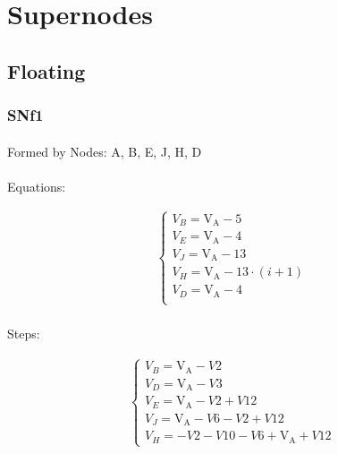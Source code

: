 \documentclass[a4paper]{article}
\begin{document}
\section{Supernodes}

\subsection{Floating}

\subsubsection{SNf1}


\paragraph{} Formed by Nodes: {A, B, E, J, H, D}
\par

\paragraph{} Equations:

\begin{gather*}
\begin{cases}
V_{B} = \mathrm{V_{A}}-5\\V_{E} = \mathrm{V_{A}}-4\\V_{J} = \mathrm{V_{A}}-13\\V_{H} = \mathrm{V_{A}}-13\cdot\left( i+1\right)\\V_{D} = \mathrm{V_{A}}-4\\
\end{cases}
\end{gather*}
\par

\paragraph{} Steps:

\begin{gather*}
\begin{cases}V_{B} = \mathrm{V_{A}}- V2\\[0.7em] V_{D} = \mathrm{V_{A}}- V3\\[0.7em] V_{E} = \mathrm{V_{A}}- V2+ V12\\[0.7em] V_{J} = \mathrm{V_{A}}- V6- V2+ V12\\[0.7em] V_{H} = - V2- V10- V6+\mathrm{V_{A}}+ V12\end{cases}
\end{gather*}
\end{document}
